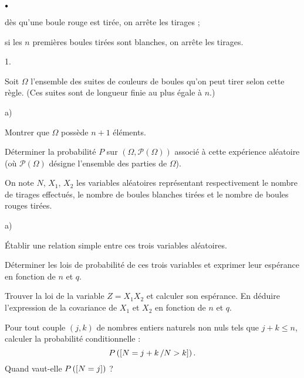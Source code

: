 \documentclass[11pt]{article}%
\begin{document}
\begin{noliste}{$\scriptstyle \bullet$}
\item dès qu'une boule rouge est tirée, on arrête les tirages ;

\item si les $n$ premières boules tirées sont blanches, on arrête les
tirages.
\end{noliste}

\begin{noliste}{1.}
 \setlength{\itemsep}{4mm}
\item Soit $\Omega $ l'ensemble des suites de couleurs de boules qu'on
peut
tirer selon cette règle. (Ces suites sont de longueur finie au plus
égale à $n$.)

\begin{noliste}{a)}
 \setlength{\itemsep}{2mm}
\item Montrer que $\Omega $ possède $n + 1$ éléments.

\item Déterminer la probabilité $P$ sur $\left(
\Omega,\mathcal{P}\left(
\Omega \right) \right) $ associé à cette expérience aléatoire (où
$\mathcal{P}\left( \Omega \right) $ désigne l'ensemble des parties de
$\Omega $).
\end{noliste}

\item On note $N$, $X_{1}$, $X_{2}$ les variables aléatoires
représentant
respectivement le nombre de tirages effectués, le nombre de boules
blanches
tirées et le nombre de boules rouges tirées.

\begin{noliste}{a)}
 \setlength{\itemsep}{2mm}
\item Établir une relation simple entre ces trois variables aléatoires.

\item Déterminer les lois de probabilité de ces trois variables et
exprimer
leur espérance en fonction de $n$ et $q$.
\end{noliste}

\item Trouver la loi de la variable $Z = X_{1}X_{2}$ et calculer son
espérance. En déduire l'expression de la covariance de $X_{1}$ et
$X_{2}$ en
fonction de $n$ et $q$.

\item Pour tout couple $(j,k)$ de nombres entiers naturels non nuls
tels que 
$j + k\leq n$, calculer la probabilité conditionnelle : 
\[
P\left(\left[ {N = j + k\,/N>k} \right]\right).
\]
Quand vaut-elle $P\left(\left[ {N = j} \right]\right)$ ?
\end{noliste}

\label{fin}
\end{document}
